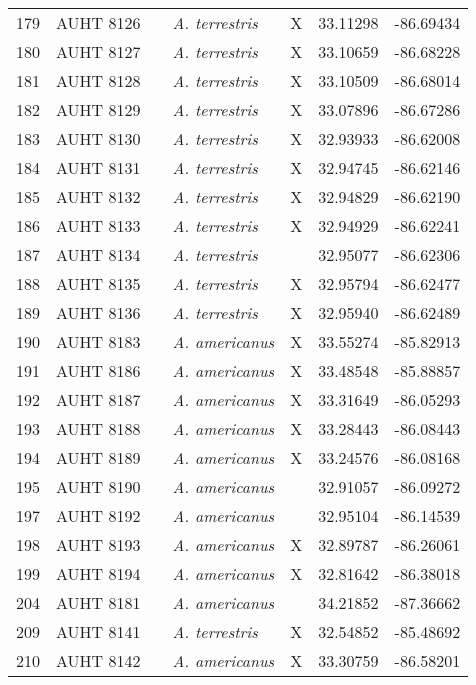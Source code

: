 \begin{longtable}{ lllllll }
179 & AUHT 8126 &  & \textit{A. terrestris} & X & 33.11298 & -86.69434 \\ 
180 & AUHT 8127 &  & \textit{A. terrestris} & X & 33.10659 & -86.68228 \\ 
181 & AUHT 8128 &  & \textit{A. terrestris} & X & 33.10509 & -86.68014 \\ 
182 & AUHT 8129 &  & \textit{A. terrestris} & X & 33.07896 & -86.67286 \\ 
183 & AUHT 8130 &  & \textit{A. terrestris} & X & 32.93933 & -86.62008 \\ 
184 & AUHT 8131 &  & \textit{A. terrestris} & X & 32.94745 & -86.62146 \\ 
185 & AUHT 8132 &  & \textit{A. terrestris} & X & 32.94829 & -86.62190 \\ 
186 & AUHT 8133 &  & \textit{A. terrestris} & X & 32.94929 & -86.62241 \\ 
187 & AUHT 8134 &  & \textit{A. terrestris} &  & 32.95077 & -86.62306 \\ 
188 & AUHT 8135 &  & \textit{A. terrestris} & X & 32.95794 & -86.62477 \\ 
189 & AUHT 8136 &  & \textit{A. terrestris} & X & 32.95940 & -86.62489 \\ 
190 & AUHT 8183 &  & \textit{A. americanus} & X & 33.55274 & -85.82913 \\ 
191 & AUHT 8186 &  & \textit{A. americanus} & X & 33.48548 & -85.88857 \\ 
192 & AUHT 8187 &  & \textit{A. americanus} & X & 33.31649 & -86.05293 \\ 
193 & AUHT 8188 &  & \textit{A. americanus} & X & 33.28443 & -86.08443 \\ 
194 & AUHT 8189 &  & \textit{A. americanus} & X & 33.24576 & -86.08168 \\ 
195 & AUHT 8190 &  & \textit{A. americanus} &  & 32.91057 & -86.09272 \\ 
197 & AUHT 8192 &  & \textit{A. americanus} &  & 32.95104 & -86.14539 \\ 
198 & AUHT 8193 &  & \textit{A. americanus} & X & 32.89787 & -86.26061 \\ 
199 & AUHT 8194 &  & \textit{A. americanus} & X & 32.81642 & -86.38018 \\ 
204 & AUHT 8181 &  & \textit{A. americanus} &  & 34.21852 & -87.36662 \\ 
209 & AUHT 8141 &  & \textit{A. terrestris} & X & 32.54852 & -85.48692 \\ 
210 & AUHT 8142 &  & \textit{A. americanus} & X & 33.30759 & -86.58201 \\ 

\end{longtable}
